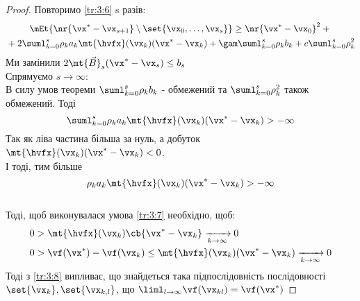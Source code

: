 \begin{proof}
Повторимо \eqref{tr:3:6} s разів:\\
\begin{multline}
\mEt{\nr{\vx^\ast-\vx_{s+1}}\setminus\set{\vx_0,\ldots,\vx_s}} \geq \nr{\vx^\ast-\vx_0}^2 + {} \\ {} +2 \suml_{k=0}^s \rho_k a_k \mt{\hvfx}(\vx_k) (\vx^\ast-\vx_k) + \gam \suml_{k=0}^s \rho_k b_k + c\suml_{k=0}^s \rho_k^2
\end{multline}
Ми замінили $2\mt{\vec{B}}_s (\vx^\ast - \vx_s) \leq b_s$\\
Спрямуємо $s\to\infty$:\\
В силу умов теореми $\suml_{k=0}^s \rho_kb_k$ - обмежений та $\suml_{k=0}^s \rho_k^2$ також обмежений. Тоді 
\begin{equation}
\suml_{k=0}^s \rho_k a_k \mt{\hvfx}(\vx_k) (\vx^\ast-\vx_k)>-\infty
\end{equation}
Так як ліва частина більша за нуль, а добуток $\mt{\hvfx}(\vx_k) (\vx^\ast-\vx_k)<0$.\\
І тоді, тим більше \begin{equation}\label{tr:3:7}
\rho_k a_k \mt{\hvfx}(\vx_k) (\vx^\ast-\vx_k)>-\infty
\end{equation} \\
Тоді, щоб виконувалася умова \eqref{tr:3:7} необхідно, щоб:
\begin{eqnarray}
&0>\mt{\hvfx} (\vx_k)\cb{\vx^\ast-\vx_k} \xrightarrow[k\to\infty]{} 0\\
&0>\vf(\vx^\ast) - \vf(\vx_k) \leq \mt{\hvfx} (\vx_k) (\vx^\ast-\vx_k) \xrightarrow[k\to\infty]{} 0\label{tr:3:8}
\end{eqnarray} 
Тоді з \eqref{tr:3:8} випливає, що знайдеться така підпослідовність послідовності $\set{\vx_k},\set{\vx_{k,l}}$, що $\liml_{l\to\infty} \vf(\vx_{kl}) = \vf(\vx^\ast)$
\end{proof}
